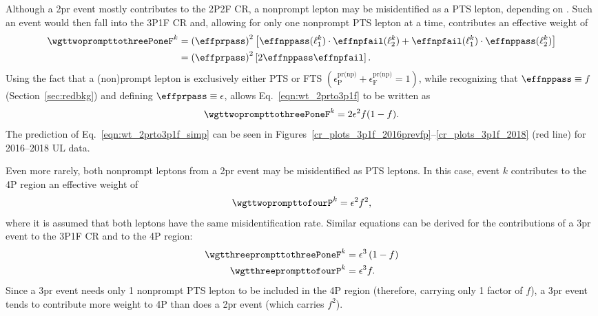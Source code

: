 Although a 2pr event mostly contributes to the 2P2F CR, a nonprompt lepton may be misidentified as a PTS lepton, depending on \effnppass.
Such an event would then fall into the 3P1F CR and, allowing for only one nonprompt PTS lepton at a time, contributes an effective weight of
\begin{align}
	\label{eqn:wt_2prto3p1f}
	\wgttwoprompttothreePoneF^k
	&= \left( \effprpass \right)^2 
	\left[
		\effnppass(\ell_1^k) \cdot \effnpfail(\ell_2^k) + \effnpfail(\ell_1^k) \cdot \effnppass(\ell_2^k)
	\right]
	\notag
	\\
	&= \left( \effprpass \right)^2
	\left[
		2 \effnppass \effnpfail
	\right].
\end{align}
Using the fact that a (non)prompt lepton is exclusively either PTS or FTS
$\left( \epsilon^\text{pr(np)}_\text{P} + \epsilon^\text{pr(np)}_\text{F} = 1 \right)$,
while recognizing that $\effnppass \equiv f$ (Section~\ref{sec:redbkg}) and defining $\effprpass \equiv \epsilon$,
allows Eq.~\ref{eqn:wt_2prto3p1f} to be written as
\begin{equation}
	\label{eqn:wt_2prto3p1f_simp}
	\wgttwoprompttothreePoneF^k = 2 \epsilon^2 f (1-f).
\end{equation}
The prediction of Eq.~\ref{eqn:wt_2prto3p1f_simp} can be seen in Figures~\ref{cr_plots_3p1f_2016prevfp}--\ref{cr_plots_3p1f_2018} (red line) for 2016--2018 UL data.

Even more rarely, both nonprompt leptons from a 2pr event may be misidentified as PTS leptons.
In this case, event $k$ contributes to the 4P region an effective weight of
\begin{equation}
	\label{eqn:wt_2prto4p}
	\wgttwoprompttofourP^k = \epsilon^2 f^2,
\end{equation}
where it is assumed that both leptons have the same misidentification rate.
Similar equations can be derived for the contributions of a 3pr event to the 3P1F CR and to the 4P region:
\begin{align}
	\label{eqn:wt_3prto3p1f}
	\wgtthreeprompttothreePoneF^k &= \epsilon^3 \left( 1-f \right)
	\\
	\label{eqn:wt_3prto4p}
	\wgtthreeprompttofourP^k &= \epsilon^3 f.
\end{align}
Since a 3pr event needs only 1 nonprompt PTS lepton to be included in the 4P region (therefore, carrying only 1 factor of $f$), a 3pr event tends to contribute more weight to 4P than does a 2pr event (which carries $f^2$).

